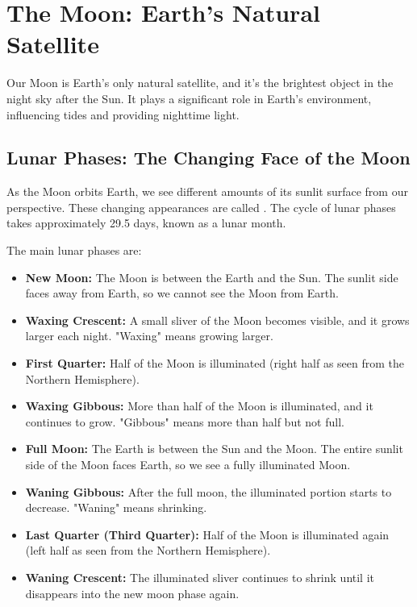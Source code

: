 \section{The Moon: Earth's Natural Satellite}

Our Moon is Earth's only natural satellite, and it's the brightest object in the night sky after the Sun.  It plays a significant role in Earth's environment, influencing tides and providing nighttime light.

\subsection{Lunar Phases: The Changing Face of the Moon}

As the Moon orbits Earth, we see different amounts of its sunlit surface from our perspective. These changing appearances are called . The cycle of lunar phases takes approximately 29.5 days, known as a lunar month.

The main lunar phases are:

\begin{itemize}
    \item \textbf{New Moon:} The Moon is between the Earth and the Sun. The sunlit side faces away from Earth, so we cannot see the Moon from Earth.
    \item \textbf{Waxing Crescent:}  A small sliver of the Moon becomes visible, and it grows larger each night. "Waxing" means growing larger.
    \item \textbf{First Quarter:} Half of the Moon is illuminated (right half as seen from the Northern Hemisphere).
    \item \textbf{Waxing Gibbous:} More than half of the Moon is illuminated, and it continues to grow. "Gibbous" means more than half but not full.
    \item \textbf{Full Moon:} The Earth is between the Sun and the Moon. The entire sunlit side of the Moon faces Earth, so we see a fully illuminated Moon.
    \item \textbf{Waning Gibbous:} After the full moon, the illuminated portion starts to decrease. "Waning" means shrinking.
    \item \textbf{Last Quarter (Third Quarter):} Half of the Moon is illuminated again (left half as seen from the Northern Hemisphere).
    \item \textbf{Waning Crescent:} The illuminated sliver continues to shrink until it disappears into the new moon phase again.
\end{itemize}

